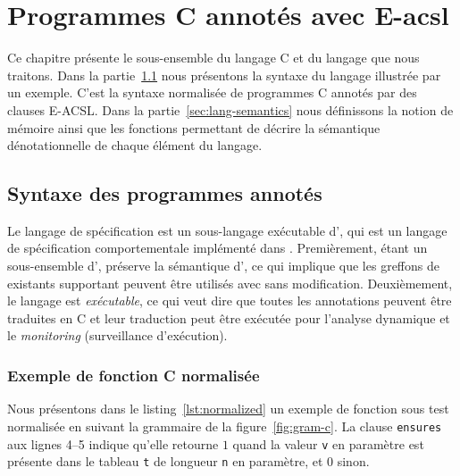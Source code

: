 
\chapter{Programmes C annotés avec E-acsl}
\label{sec:lang}

\chapterintro


Ce chapitre présente le sous-ensemble du langage C et du langage \eacsl que nous
traitons.
Dans la partie~\ref{sec:lang-syntax} nous présentons la syntaxe du langage
illustrée par un exemple.
C'est la syntaxe normalisée de programmes C annotés par des clauses E-ACSL.
Dans la partie~\ref{sec:lang-semantics} nous définissons la notion de mémoire
ainsi que les fonctions permettant de décrire la sémantique dénotationnelle de
chaque élément du langage.


\section{Syntaxe des programmes annotés}
\label{sec:lang-syntax}


Le langage de spécification \eacsl est un sous-langage exécutable d'\acsl, qui
est un langage de spécification comportementale implémenté dans \framac.
Premièrement, étant un sous-ensemble d'\acsl, \eacsl préserve la sémantique
d'\acsl, ce qui implique que les greffons de \framac existants supportant \acsl
peuvent être utilisés avec \eacsl sans modification.
Deuxièmement, le langage \eacsl est \textit{exécutable}, ce qui veut dire que
toutes les annotations peuvent être traduites en C et leur traduction peut être
exécutée pour l'analyse dynamique et le \textit{monitoring} (surveillance
d'exécution).


\subsection{Exemple de fonction C normalisée}
\label{sec:translation-example}




Nous présentons dans le listing~\ref{lst:normalized} un exemple de fonction sous
test normalisée en suivant la grammaire de la figure~\ref{fig:gram-c}.
La clause \lstinline'ensures' aux lignes 4--5 indique qu'elle retourne $1$ quand
la valeur \lstinline'v' en paramètre est présente dans le tableau \lstinline't'
de longueur \lstinline'n' en paramètre, et $0$ sinon.

